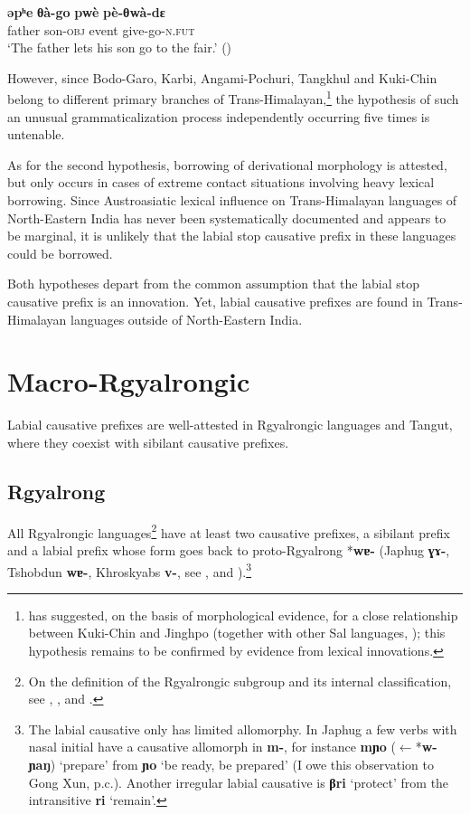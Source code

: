 \documentclass[oneside,a4paper,11pt]{article}
\newcommand{\ipa}[1]{\textbf{{\phon\mbox{#1}}}} %
\newcommand{\forme}[2]{\ipa{#1} `#2'}
\begin{document}
\begin{exe}
\ex \label{ex:pethwaday}
\gll \ipa{əpʰe} \ipa{θà-go} \ipa{pwè} \ipa{pè-θwà-dɛ} \\
father son-\textsc{obj} event give-go-\textsc{n.fut} \\
\glt `The father lets his son go to the fair.' (\citealt[196]{jenny16grammar})
\end{exe}

However, since  Bodo-Garo, Karbi, Angami-Pochuri, Tangkhul and Kuki-Chin belong to different primary branches of Trans-Himalayan,\footnote{\citet{delancey15central} has suggested, on the basis of morphological evidence, for a close relationship between Kuki-Chin and Jinghpo (together with other Sal languages, \citealt{burling83sal}); this hypothesis remains to be confirmed by evidence from lexical innovations.} the hypothesis of such an unusual grammaticalization process independently occurring five times is untenable.

As for the second hypothesis, borrowing of derivational morphology is attested, but only occurs in cases of extreme contact situations involving heavy lexical borrowing. Since Austroasiatic lexical influence on Trans-Himalayan languages of North-Eastern India has never been systematically documented and appears to be marginal, it is unlikely that the labial stop causative prefix in these languages could be borrowed.

Both hypotheses depart from the common assumption that the labial stop causative prefix is an innovation. Yet, labial causative prefixes are found in Trans-Himalayan languages outside of North-Eastern India. 

\section{Macro-Rgyalrongic}
Labial causative prefixes are well-attested in Rgyalrongic languages and Tangut, where they coexist with sibilant causative prefixes.

\subsection{Rgyalrong} \label{sec:japhug}
All Rgyalrongic languages\footnote{On the definition of the Rgyalrongic subgroup and its internal classification, see \citet{jackson00sidaba}, \citet{jackson00puxi}, \citet{jacques14esquisse} and \citet{lai15person}.} have at least two causative prefixes, a sibilant prefix and a labial prefix whose form goes back to proto-Rgyalrong *\ipa{wɐ-} (Japhug \ipa{ɣɤ-}, Tshobdun \ipa{wɐ-}, Khroskyabs \ipa{v-}, see \citealt[322]{jacques04these}, \citealt{jackson06paisheng} and \citealt[136]{lai13affixale}).\footnote{The labial causative only has limited allomorphy. In Japhug a few verbs with nasal initial have a causative allomorph in \ipa{m-}, for instance \ipa{mɲo} ($\leftarrow$*\ipa{w-ɲaŋ}) `prepare' from \forme{ɲo}{be ready, be prepared} (I owe this observation to Gong Xun, p.c.). Another irregular labial causative is \ipa{βri} `protect' from the intransitive \ipa{ri} `remain'.}
\end{document}
